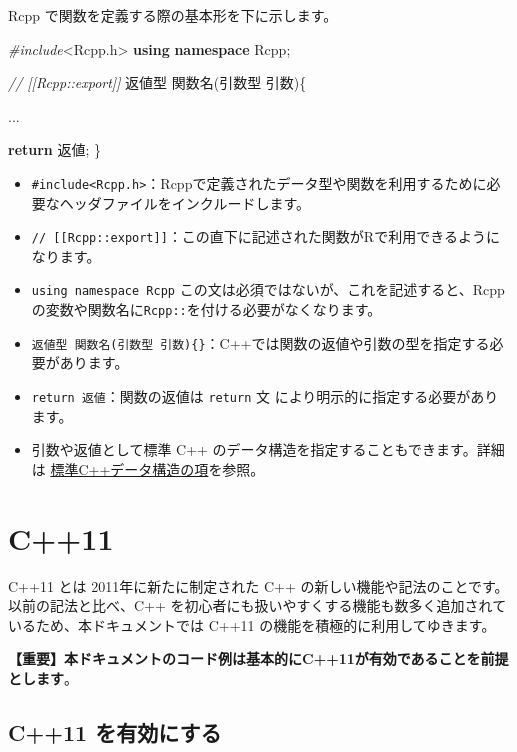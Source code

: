 \documentclass[]{book}
\newenvironment{Shaded}{\begin{snugshade}}{\end{snugshade}}
\newcommand{\CommentTok}[1]{\textcolor[rgb]{0.56,0.35,0.01}{\textit{#1}}}
\newcommand{\ControlFlowTok}[1]{\textcolor[rgb]{0.13,0.29,0.53}{\textbf{#1}}}
\newcommand{\ImportTok}[1]{#1}
\newcommand{\KeywordTok}[1]{\textcolor[rgb]{0.13,0.29,0.53}{\textbf{#1}}}
\newcommand{\NormalTok}[1]{#1}
\newcommand{\PreprocessorTok}[1]{\textcolor[rgb]{0.56,0.35,0.01}{\textit{#1}}}
\providecommand{\tightlist}{%
  \setlength{\itemsep}{0pt}\setlength{\parskip}{0pt}}
\begin{document}
Rcpp で関数を定義する際の基本形を下に示します。

\begin{Shaded}
\begin{Highlighting}[]
\PreprocessorTok{#include}\ImportTok{<Rcpp.h>}
\KeywordTok{using} \KeywordTok{namespace}\NormalTok{ Rcpp;}

\CommentTok{// [[Rcpp::export]]}
\NormalTok{返値型 関数名(引数型 引数)\{}

\NormalTok{    ...}

    \ControlFlowTok{return}\NormalTok{ 返値;}
\NormalTok{\}}
\end{Highlighting}
\end{Shaded}

\begin{itemize}
\tightlist
\item
  \texttt{\#include\textless{}Rcpp.h\textgreater{}}：Rcppで定義されたデータ型や関数を利用するために必要なヘッダファイルをインクルードします。
\item
  \texttt{//\ {[}{[}Rcpp::export{]}{]}}：この直下に記述された関数がRで利用できるようになります。
\item
  \texttt{using\ namespace\ Rcpp} この文は必須ではないが、これを記述すると、Rcppの変数や関数名に\texttt{Rcpp::}を付ける必要がなくなります。
\item
  \texttt{返値型\ 関数名(引数型\ 引数)\{\}}：C++では関数の返値や引数の型を指定する必要があります。
\item
  \texttt{return\ 返値}：関数の返値は \texttt{return} 文 により明示的に指定する必要があります。
\item
  引数や返値として標準 C++ のデータ構造を指定することもできます。詳細は \href{as_wrap.md}{標準C++データ構造の項}を参照。
\end{itemize}

\hypertarget{c11}{%
\chapter{C++11}\label{c11}}

C++11 とは 2011年に新たに制定された C++ の新しい機能や記法のことです。以前の記法と比べ、C++ を初心者にも扱いやすくする機能も数多く追加されているため、本ドキュメントでは C++11 の機能を積極的に利用してゆきます。

\textbf{【重要】本ドキュメントのコード例は基本的にC++11が有効であることを前提とします}。

\hypertarget{c11-}{%
\section{C++11 を有効にする}\label{c11-}}
\end{document}
